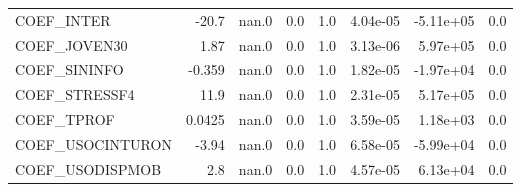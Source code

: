 \begin{tabular}{lrrrrrrr}
COEF\_INTER       &     -20.7 &    nan.0 &     0.0 &      1.0 &      4.04e-05 &    -5.11e+05 &           0.0 \\
COEF\_JOVEN30     &      1.87 &    nan.0 &     0.0 &      1.0 &      3.13e-06 &     5.97e+05 &           0.0 \\
COEF\_SININFO     &    -0.359 &    nan.0 &     0.0 &      1.0 &      1.82e-05 &    -1.97e+04 &           0.0 \\
COEF\_STRESSF4    &      11.9 &    nan.0 &     0.0 &      1.0 &      2.31e-05 &     5.17e+05 &           0.0 \\
COEF\_TPROF       &    0.0425 &    nan.0 &     0.0 &      1.0 &      3.59e-05 &     1.18e+03 &           0.0 \\
COEF\_USOCINTURON &     -3.94 &    nan.0 &     0.0 &      1.0 &      6.58e-05 &    -5.99e+04 &           0.0 \\
COEF\_USODISPMOB  &       2.8 &    nan.0 &     0.0 &      1.0 &      4.57e-05 &     6.13e+04 &           0.0 \\
\bottomrule
\end{tabular}

